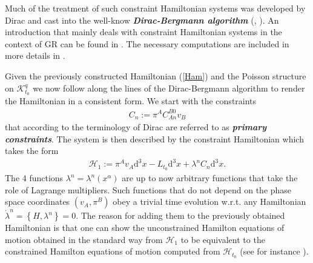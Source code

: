 \documentclass[a4paper,12pt, DIV=14, BCOR=5mm, twoside, headsepline, numbers=noenddot]{scrbook}
\begin{document}
Much of the treatment of such constraint Hamiltonian systems was developed by Dirac \cite{dirac_1950} and cast into the well-know \textit{\textbf{Dirac-Bergmann algorithm}} (\cite{PhysRev.83.1018}, \cite{doi:10.1063/1.523597}). An introduction that mainly deals with constraint Hamiltonian systems in the context of GR can be found in \cite{bojowald_2010}. The necessary computations are included in more details in \cite{thiemann_2007}. 

Given the previously constructed Hamiltonian (\ref{Ham}) and the Poisson structure on $\mathcal{K}^q_{t_0}$ we now follow along the lines of the Dirac-Bergmann algorithm to render the Hamiltonian in a consistent form. We start with the constraints 
\begin{align}
C_n := \pi^A C_{An}^{B0}v_B
\end{align}
that according to the terminology of Dirac are referred to as \textbf{\textit{primary constraints}}. The system is then described by the constraint Hamiltonian which takes the form 
\begin{align}
\mathcal{H}_1 := \pi^A v_A \mathrm{d}^3x -L_{t_0}\mathrm{d}^3x + \lambda^n C_n\mathrm{d}^3x.
\end{align}
The 4 functions $\lambda^n = \lambda^n(x^{\alpha})$ are up to now arbitrary functions that take the role of Lagrange multipliers. Such functions that do not depend on the phase space coordinates $(v_A, \pi^B)$ obey a trivial time evolution w.r.t. any Hamiltonian $\dot{\lambda}^n = \left \{H, \lambda^n \right \} = 0$. The reason for adding them to the previously obtained Hamiltonian is that one can show the unconstrained Hamilton equations of motion obtained in the standard way from $\mathcal{H}_1$ to be equivalent to the constrained Hamilton equations of motion computed from $\mathcal{H}_{t_0}$ (see for instance \cite{bojowald_2010}).
\end{document}
